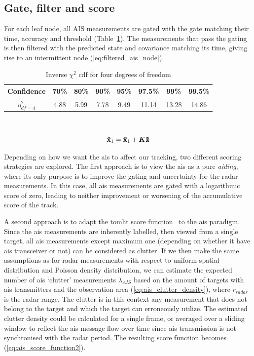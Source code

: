 \subsection{Gate, filter and score}\label{sec:ais_gate_filter_score}
For each leaf node, all AIS measurements are gated with the gate matching their time, accuracy and threshold (Table~\ref{tab:chi_square_4_dof}). The measurements that pass the gating is then filtered with the predicted state and covariance matching its time, giving rise to an intermittent node (\ref{eq:filtered_ais_node}).
\begin{table}
\centering
\begin{tabular}{c c c c c c c c}
Confidence 	& 70\% 	& 80\% 	& 90\% 	& 95\% 	& 97.5\% 	& 99\% 	& 99.5\% \\ 
\midrule
\(\eta^2_{df=4}\) 	& 4.88 	& 5.99 	& 7.78 	& 9.49 	& 11.14 & 13.28	& 14.86
\end{tabular}\caption{Inverse \(\chi^2\) \gls{cdf} for four degrees of freedom}
~\label{tab:chi_square_4_dof}
\end{table}
\begin{equation}\label{eq:filtered_ais_node}
\boldsymbol{\mathbf{\hat{x}}}_1 = \boldsymbol{\mathbf{\bar{x}}}_1 + \bm{K} \boldsymbol{\mathbf{\tilde{z}}}
\end{equation}

Depending on how we want the \gls{ais} to affect our tracking, two different scoring strategies are explored. The first approach is to view the \gls{ais} as a pure \emph{aiding}, where its only purpose is to improve the gating and uncertainty for the radar measurements. In this case, all \gls{ais} measurements are gated with a logarithmic score of zero, leading to neither improvement or worsening of the accumulative score of the track.

A second approach is to adapt the \gls{tomht} score function~\cite{Bar-Shalom2007} to the \gls{ais} paradigm. Since the \gls{ais} measurements are inherently labelled, then viewed from a single target, all \gls{ais} measurements except maximum one (depending on whether it have \gls{ais} transceiver or not) can be considered as clutter. If we then make the same assumptions as for radar measurements with respect to uniform spatial distribution and Poisson density distribution, we can estimate the expected number of \gls{ais} `clutter' measurements \( \lambda_{AIS} \) based on the amount of targets with \gls{ais} transmitters and the observation area (\ref{eq:ais_clutter_density}), where \(r_{radar}\) is the radar range. The clutter is in this context any measurement that does not belong to the target and which the target can erroneously utilize. The estimated clutter density could be calculated for a single frame, or averaged over a sliding window to reflect the \gls{ais} message flow over time since \gls{ais} transmission is not synchronised with the radar period. The resulting score function becomes (\ref{eq:ais_score_function2}).


